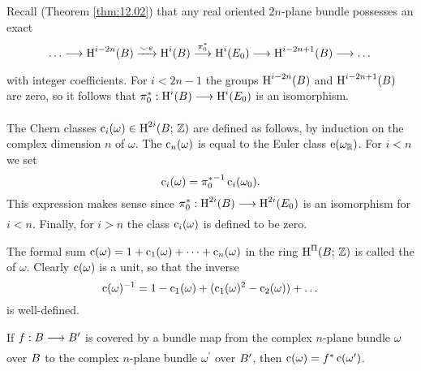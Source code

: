 \documentclass[../main]{subfiles}
\begin{document}
Recall (Theorem \ref{thm:12.02}) that any real oriented $2n$-plane bundle possesses an exact  
\[
\dots\varrightarrow{}\homology^{i-2n}(\B)\varrightarrow{\smile \eulerclass}\homology^i(\B)\varrightarrow{\pi_0^\ast}\homology^i(\total_0)\varrightarrow{}\homology^{i-2n+1}(\B)\varrightarrow{}\dots
\]
with integer coefficients. For $i<2n-1$ the groups $\operatorname{H}^{i-2n}(B)$ and $\operatorname{H}^{i-2n+1}(B)$ are zero, so it follows that $\pi_0^\ast:\homology^i(\B)\varrightarrow{}\homology^i(\total_0)$ is an isomorphism.
\begin{definition}
The Chern classes $\operatorname{c}_i(\omega)\in\operatorname{H}^{2i}(B;\,\mathbb{Z})$ are defined as follows, by induction on the complex dimension $n$ of $\omega$. The  $\operatorname{c}_n(\omega)$ is equal to the Euler class $\operatorname{e}(\omega_\mathbb R)$. For $i<n$ we set 
\[\operatorname{c}_i(\omega) = {\pi_0^\ast}^{-1}\operatorname{c}_i(\omega_0).\]
This expression makes sense since $\pi_0^\ast:\homology^{2i}(\B)\varrightarrow{}\homology^{2i}(\total_0)$ is an isomorphism for $i<n$. Finally, for $i>n$ the class $\operatorname{c}_i(\omega)$ is defined to be zero.
\end{definition}
The formal sum $\operatorname{c}(\omega) = 1+\operatorname{c}_1(\omega)+\dots+\operatorname{c}_n(\omega)$ in the ring $\operatorname{H}^\Pi(B;\,\mathbb{Z})$ is called the  of $\omega$. Clearly $\operatorname{c}(\omega)$ is a unit, so that the inverse 
\[\operatorname{c}(\omega)^{-1} = 1 - \operatorname{c}_1(\omega) + (\operatorname{c}_1(\omega)^2 - \operatorname{c}_2(\omega)) + \dots\]
is well-defined.
\begin{lemma}[Naturality]
\label{lem:14.02}
If $f:B\varrightarrow{}B^\prime$ is covered by a bundle map from the complex $n$-plane bundle $\omega$ over $B$ to the complex $n$-plane bundle $\omega^\prime$ over $B^\prime$, then $\operatorname{c}(\omega) = f^\ast \operatorname{c}(\omega^\prime)$.
\end{lemma}
\end{document}
